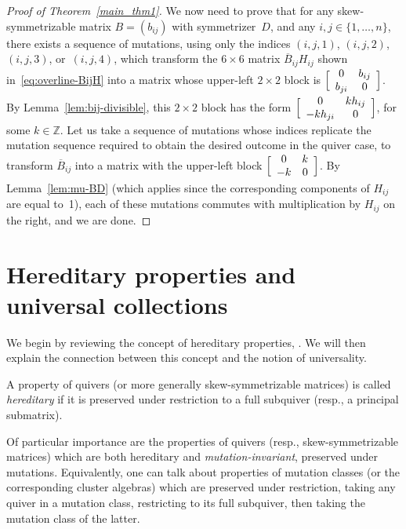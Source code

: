 \documentclass[ALCO,ThmDefs,Unicode,epreuves,published]{cedram}
\begin{document}
\begin{proof}[Proof of Theorem~\ref{main_thm1}]
We now need to prove that for any skew-symmetrizable matrix $B=(b_{ij})$ with symmetrizer~$D$, and any $i,j\in\{1,\dots,n\}$, there exists a sequence of mutations, using only the indices $(i,j,1)$, $(i,j,2)$, $(i,j,3)$, or~$(i,j,4)$, which transform the $6\times 6$ matrix $\overline B_{ij} H_{ij}$ shown in~\eqref{eq:overline-BijH} into a matrix whose upper-left $2\times 2$ block is $\Bigl[\begin{array}{cc} 0 & b_{ij}\\ b_{ji} & 0 \end{array}\Bigr]$. 
By Lemma~\ref{lem:bij-divisible}, this $2\times 2$ block has the form $ \Bigl[\begin{array}{cc}
0 & kh_{ij} \\
-kh_{ji} & 0
\end{array}\Bigr]$, for some $k\in\mathbb{Z}$. 
Let us take a sequence of mutations whose indices replicate the mutation sequence required to obtain the desired outcome in the quiver case, \ie 
to transform $\overline B_{ij}$ into a matrix with the upper-left block $\Bigl[\begin{array}{cc}
0 & k \\
-k & 0
\end{array}\Bigr]$. 
By Lemma~\ref{lem:mu-BD} (which applies since the corresponding components of $H_{ij}$ are equal to~1), each of these mutations commutes with multiplication by $H_{ij}$ on the right, and we are done. 
\end{proof}


\section{Hereditary properties and universal collections}
\label{sec:hereditary+universal}

We begin by reviewing the concept of hereditary properties, \cf \cite[Section~4.1]{FWZ}. We will then explain the connection between this concept and the notion of universality. 

\begin{definition}
\label{def:hereditary}
A property of quivers (or more generally skew-symmetrizable matrices) is called \emph{hereditary} if it is preserved under restriction to a full subquiver (resp., a principal submatrix). 

Of particular importance are the properties of quivers (resp., skew-symmetrizable matrices) which are both hereditary and \emph{mutation-invariant}, \ie preserved under mutations. 
Equivalently, one can talk about properties of mutation classes (or the corresponding cluster algebras) which are preserved under restriction, \ie taking any quiver in a mutation class, restricting to its full subquiver, then taking the mutation class of the latter. 
\end{definition}
\end{document}
